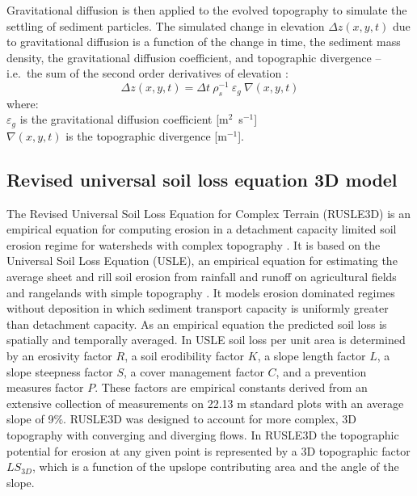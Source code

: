 \documentclass[gmd, manuscript]{copernicus}
\begin{document}
\noindent
Gravitational diffusion is then applied to the evolved topography
to simulate the settling of sediment particles. 
The simulated change in elevation $\Delta z(x,y,t)$ due to gravitational diffusion 
is a function of the change in time, the sediment mass density, 
the gravitational diffusion coefficient, and topographic divergence 
-- i.e.~the sum of the second order derivatives of elevation
\citep{thaxton2004}:
\begin{equation}
\label{eq:grav_diffusion} 
{\Delta z(x,y,t) = \Delta t ~ \rho_s^{-1} ~ \varepsilon_g ~ \nabla(x,y,t)}
\end{equation}
{\small
\noindent
where: \\
\noindent
\hspace*{0.5em} $\varepsilon_g$ is the gravitational diffusion coefficient [\unit{m}$^{2}$~\unit{s}$^{-1}$]\\ %
\hspace*{0.5em} $\nabla(x,y,t)$ is the topographic divergence [\unit{m}$^{-1}$].\\
}

\subsection{Revised universal soil loss equation 3D model}
\label{rusle_model}
The Revised Universal Soil Loss Equation for Complex Terrain (RUSLE3D) 
is an empirical equation for computing erosion 
in a detachment capacity limited soil erosion regime
for watersheds with complex topography \citep{Mitasova1996}. 
It is based on 
the Universal Soil Loss Equation (USLE),
an empirical equation for estimating the average
sheet and rill soil erosion from rainfall and runoff
on agricultural fields and rangelands with simple topography 
\citep{Wischmeier1978}. 
It models erosion dominated regimes without deposition
in which sediment transport capacity is 
uniformly greater than detachment capacity.
As an empirical equation the predicted soil loss 
is spatially and temporally averaged. 
In USLE soil loss per unit area is determined by 
an erosivity factor $R$,
a soil erodibility factor $K$, 
a slope length factor $L$,
a slope steepness factor $S$,
a cover management factor $C$,
and a prevention measures factor $P$.
These factors are empirical constants derived 
from an extensive collection of measurements 
on 22.13 \unit{m} standard plots with an average slope of 9$\%$.  
RUSLE3D was designed to account for more complex, 3D topography 
with converging and diverging flows. 
In RUSLE3D the topographic potential for erosion at any given point 
is represented by a 3D topographic factor $LS_{3D}$,
which is a function of the upslope contributing area 
and the angle of the slope. 
\end{document}
